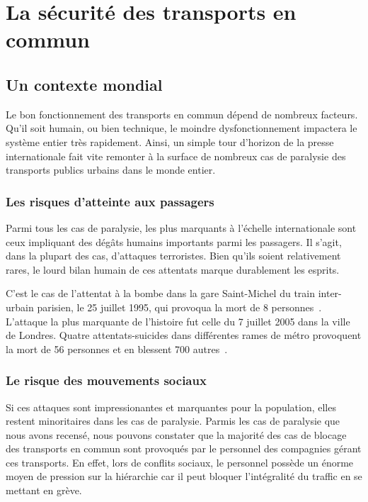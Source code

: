 \section{ La sécurité des transports en commun }

	\subsection{Un contexte mondial}

	Le bon fonctionnement des transports en commun dépend de nombreux facteurs. Qu'il soit humain, ou bien technique, le moindre dysfonctionnement impactera le système entier très rapidement. Ainsi, un simple tour d'horizon de la presse internationale fait vite remonter à la surface de nombreux cas de paralysie des transports publics urbains dans le monde entier.

		\subsubsection{ Les risques d'atteinte aux passagers }

	Parmi tous les cas de paralysie, les plus marquants à l'échelle internationale sont ceux impliquant des dégâts humains importants parmi les passagers. Il s'agit, dans la plupart des cas, d'attaques terroristes. Bien qu'ils soient relativement rares, le lourd bilan humain de ces attentats marque durablement les esprits.

	C'est le cas de l'attentat à la bombe dans la gare Saint-Michel du train inter-urbain parisien, le 25 juillet 1995, qui provoqua la mort de 8 personnes~\cite{stmichel}. L'attaque la plus marquante de l'histoire fut celle du 7 juillet 2005 dans la ville de Londres. Quatre attentats-suicides dans différentes rames de métro provoquent la mort de 56 personnes et en blessent 700 autres~\cite{london_attacks}.

    	\subsubsection{ Le risque des mouvements sociaux }
    	
	Si ces attaques sont impressionantes et marquantes pour la population, elles restent minoritaires dans les cas de paralysie. Parmis les cas de paralysie que nous avons recensé, nous pouvons constater que la majorité des cas de blocage des transports en commun sont provoqués par le personnel des compagnies gérant ces transports. En effet, lors de conflits sociaux, le personnel possède un énorme moyen de pression sur la hiérarchie car il peut bloquer l'intégralité du traffic en se mettant en grève. 

